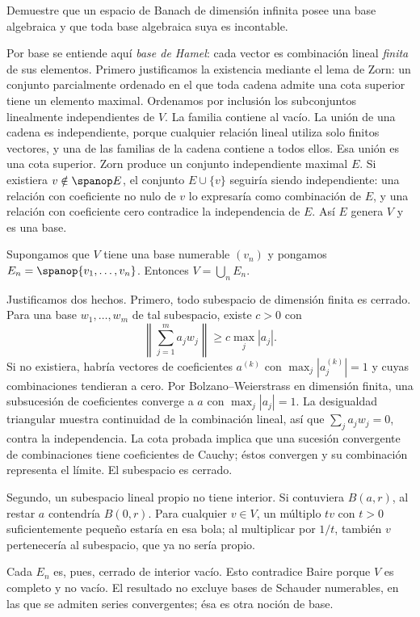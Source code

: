 \begin{ejercicio}\label{ej:lectura-10-7}
Demuestre que un espacio de Banach de dimensión infinita posee una base algebraica y que toda base algebraica suya es incontable.
\end{ejercicio}
\begin{solucion}
Por base se entiende aquí \emph{base de Hamel}: cada vector es combinación lineal \emph{finita} de sus elementos. Primero justificamos la existencia mediante el lema de Zorn: un conjunto parcialmente ordenado en el que toda cadena admite una cota superior tiene un elemento maximal. Ordenamos por inclusión los subconjuntos linealmente independientes de $V$. La familia contiene al vacío. La unión de una cadena es independiente, porque cualquier relación lineal utiliza solo finitos vectores, y una de las familias de la cadena contiene a todos ellos. Esa unión es una cota superior. Zorn produce un conjunto independiente maximal $E$. Si existiera $v\notin\spanop E$, el conjunto $E\cup\{v\}$ seguiría siendo independiente: una relación con coeficiente no nulo de $v$ lo expresaría como combinación de $E$, y una relación con coeficiente cero contradice la independencia de $E$. Así $E$ genera $V$ y es una base.

Supongamos que $V$ tiene una base numerable $(v_n)$ y pongamos $E_n=\spanop\{v_1,\ldots,v_n\}$. Entonces $V=\bigcup_nE_n$.

Justificamos dos hechos. Primero, todo subespacio de dimensión finita es cerrado. Para una base $w_1,\ldots,w_m$ de tal subespacio, existe $c>0$ con
\[
 \left\|\sum_{j=1}^m a_jw_j\right\|\geq c\max_j|a_j|.
\]
Si no existiera, habría vectores de coeficientes $a^{(k)}$ con $\max_j|a_j^{(k)}|=1$ y cuyas combinaciones tendieran a cero. Por Bolzano--Weierstrass en dimensión finita, una subsucesión de coeficientes converge a $a$ con $\max_j|a_j|=1$. La desigualdad triangular muestra continuidad de la combinación lineal, así que $\sum_ja_jw_j=0$, contra la independencia. La cota probada implica que una sucesión convergente de combinaciones tiene coeficientes de Cauchy; éstos convergen y su combinación representa el límite. El subespacio es cerrado.

Segundo, un subespacio lineal propio no tiene interior. Si contuviera $B(a,r)$, al restar $a$ contendría $B(0,r)$. Para cualquier $v\in V$, un múltiplo $tv$ con $t>0$ suficientemente pequeño estaría en esa bola; al multiplicar por $1/t$, también $v$ pertenecería al subespacio, que ya no sería propio.

Cada $E_n$ es, pues, cerrado de interior vacío. Esto contradice Baire porque $V$ es completo y no vacío. El resultado no excluye bases de Schauder numerables, en las que se admiten series convergentes; ésa es otra noción de base.
\end{solucion}

